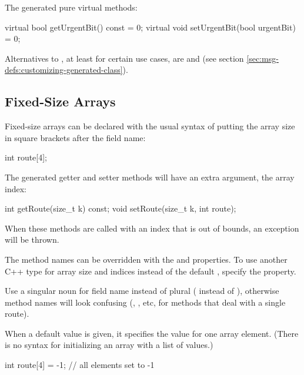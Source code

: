 The generated pure virtual methods:

\begin{cpp}
virtual bool getUrgentBit() const = 0;
virtual void setUrgentBit(bool urgentBit) = 0;
\end{cpp}

Alternatives to , at least for certain use cases, are
 and  (see section
\ref{sec:msg-defs:customizing-generated-class}).


\subsection{Fixed-Size Arrays}
\label{sec:msg-defs:fixed-size-arrays}

Fixed-size arrays can be declared with the usual syntax of putting the
array size in square brackets after the field name:

\begin{msg}
int route[4];
\end{msg}

The generated getter and setter methods will have an extra  argument,
the array index:

\begin{cpp}
int getRoute(size_t k) const;
void setRoute(size_t k, int route);
\end{cpp}

When these methods are called with an index that is out of bounds, an exception
will be thrown.

The method names can be overridden with the  and 
properties. To use another C++ type for array size and indices instead of the
default , specify the  property.

\begin{note}
  Use a singular noun for field name instead of plural ( instead of
  ), otherwise method names will look confusing (,
  , etc, for methods that deal with a single route).
\end{note}

When a default value is given, it specifies the value for one array element.
(There is no syntax for initializing an array with a list of values.)

\begin{msg}
int route[4] = -1; // all elements set to -1
\end{msg}


